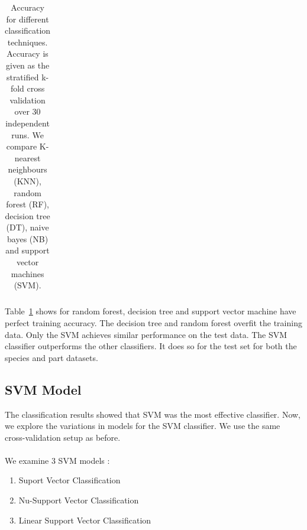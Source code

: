 \documentclass[runningheads]{llncs}
\begin{document}
\begin{table}[htb]
\begin{tabular}{|l|l|l|l|l|}
    \hline
  \end{tabular}
  \caption{
    Accuracy for different classification techniques.
    Accuracy is given as the stratified k-fold cross validation over 30 independent runs.
    We compare K-nearest neighbours (KNN), random forest (RF), decision tree (DT), naive bayes (NB) and support vector machines (SVM).}
  \label{t:classification}
\end{table}

Table~\ref{t:classification} shows for random forest, decision tree and support vector machine have perfect training accuracy.
The decision tree and random forest overfit the training data.
Only the SVM achieves similar performance on the test data.
The SVM classifier outperforms the other classifiers.
It does so for the test set for both the species and part datasets.

\subsection{SVM Model}
\label{sec:results-classification-svm}

The classification results showed that SVM was the most effective classifier.
Now, we explore the variations in models for the SVM classifier.
We use the same cross-validation setup as before.
\\\\
We examine 3 SVM models \cite{sklearn2021feature}:

\begin{enumerate}
  \item Suport Vector Classification \cite{cortes1995support}
  \item Nu-Support Vector Classification \cite{scholkopf2000new}
  \item Linear Support Vector Classification
\end{enumerate}
\end{document}
